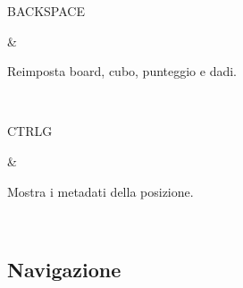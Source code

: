 \documentclass[letterpaper,10pt,italian]{sphinxmanual}
\begin{document}
\begin{savenotes}
\begin{tabular}[t]{}
\begin{varwidth}[t]{}
\sphinxAtStartPar
BACKSPACE
\sphinxbeforeendvarwidth
\end{varwidth}%
&\begin{varwidth}[t]{}
\sphinxAtStartPar
Reimposta board, cubo, punteggio e dadi.
\sphinxbeforeendvarwidth
\end{varwidth}%
\\
\sphinxhline\begin{varwidth}[t]{}
\sphinxAtStartPar
CTRL\sphinxhyphen{}G
\sphinxbeforeendvarwidth
\end{varwidth}%
&\begin{varwidth}[t]{}
\sphinxAtStartPar
Mostra i metadati della posizione.
\sphinxbeforeendvarwidth
\end{varwidth}%
\\
\sphinxbottomrule
\end{tabular}
\sphinxtableafterendhook\par
\sphinxattableend\end{savenotes}


\subsection{Navigazione}
\label{\detokenize{raccourcis:navigation}}\label{\detokenize{raccourcis:raccourcis-navigation}}
\end{document}
